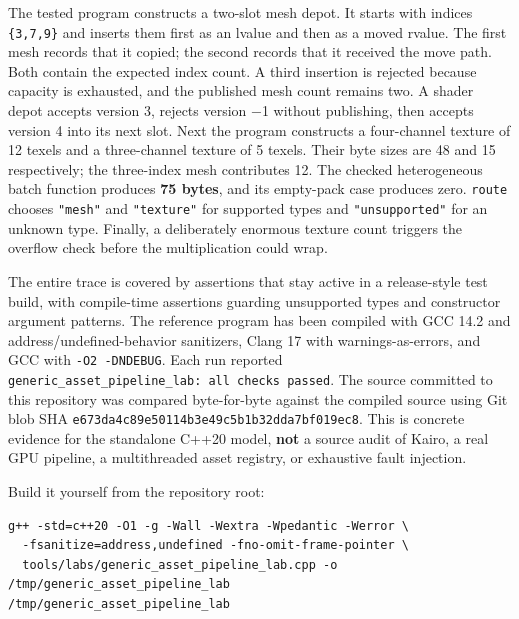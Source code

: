 The tested program constructs a two-slot mesh depot. It starts with indices \texttt{\{3,7,9\}} and inserts them first as an lvalue and then as a moved rvalue. The first mesh records that it copied; the second records that it received the move path. Both contain the expected index count. A third insertion is rejected because capacity is exhausted, and the published mesh count remains two. A shader depot accepts version 3, rejects version −1 without publishing, then accepts version 4 into its next slot. Next the program constructs a four-channel texture of 12 texels and a three-channel texture of 5 texels. Their byte sizes are 48 and 15 respectively; the three-index mesh contributes 12. The checked heterogeneous batch function produces \textbf{75 bytes}, and its empty-pack case produces zero. \texttt{route} chooses \texttt{"mesh"} and \texttt{"texture"} for supported types and \texttt{"unsupported"} for an unknown type. Finally, a deliberately enormous texture count triggers the overflow check before the multiplication could wrap.

The entire trace is covered by assertions that stay active in a release-style test build, with compile-time assertions guarding unsupported types and constructor argument patterns. The reference program has been compiled with GCC 14.2 and address/undefined-behavior sanitizers, Clang 17 with warnings-as-errors, and GCC with \texttt{-O2\ -DNDEBUG}. Each run reported \texttt{generic\_asset\_pipeline\_lab:\ all\ checks\ passed}. The source committed to this repository was compared byte-for-byte against the compiled source using Git blob SHA \texttt{e673da4c89e50114b3e49c5b1b32dda7bf019ec8}. This is concrete evidence for the standalone C++20 model, \textbf{not} a source audit of Kairo, a real GPU pipeline, a multithreaded asset registry, or exhaustive fault injection.

Build it yourself from the repository root:

\begin{verbatim}
g++ -std=c++20 -O1 -g -Wall -Wextra -Wpedantic -Werror \
  -fsanitize=address,undefined -fno-omit-frame-pointer \
  tools/labs/generic_asset_pipeline_lab.cpp -o /tmp/generic_asset_pipeline_lab
/tmp/generic_asset_pipeline_lab
\end{verbatim}

